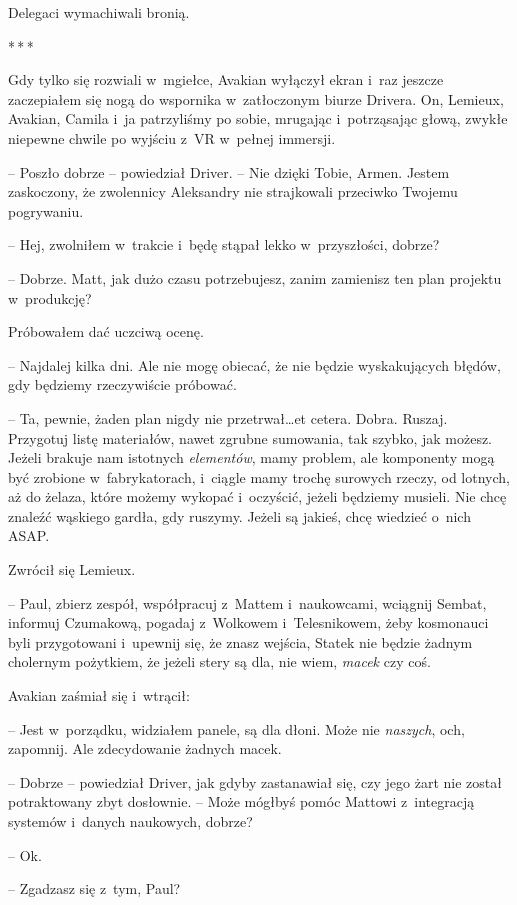 \documentclass[oneside,polish,12pt,sfheadings]{mwbk}
\newcommand{\threeast}{\bigskip\par\centerline{*\,*\,*}\medskip\par}%
\begin{document}
Delegaci wymachiwali bronią.

\threeast

Gdy tylko się rozwiali w~mgiełce, Avakian wyłączył ekran i~raz jeszcze
zaczepiałem się nogą do wspornika w~zatłoczonym biurze Drivera. On,
Lemieux, Avakian, Camila i~ja patrzyliśmy po sobie, mrugając i~potrząsając głową, zwykłe niepewne chwile po wyjściu z~VR w~pełnej
immersji.

-- Poszło dobrze -- powiedział Driver. -- Nie dzięki Tobie, Armen. Jestem
zaskoczony, że zwolennicy Aleksandry nie strajkowali przeciwko Twojemu
pogrywaniu.

-- Hej, zwolniłem w~trakcie i~będę stąpał lekko w~przyszłości, dobrze?

-- Dobrze. Matt, jak dużo czasu potrzebujesz, zanim zamienisz ten plan
projektu w~produkcję?

Próbowałem dać uczciwą ocenę. 

-- Najdalej kilka dni. Ale nie mogę
obiecać, że nie będzie wyskakujących błędów, gdy będziemy rzeczywiście
próbować.

-- Ta, pewnie, żaden plan nigdy nie przetrwał\ldots et cetera. Dobra.
Ruszaj. Przygotuj listę materiałów, nawet zgrubne sumowania, tak szybko,
jak możesz. Jeżeli brakuje nam istotnych \emph{elementów}, mamy problem,
ale komponenty mogą być zrobione w~fabrykatorach, i~ciągle mamy trochę
surowych rzeczy, od lotnych, aż do żelaza, które możemy wykopać i~oczyścić, jeżeli będziemy musieli. Nie chcę znaleźć wąskiego gardła, gdy
ruszymy. Jeżeli są jakieś, chcę wiedzieć o~nich ASAP.

Zwrócił się Lemieux. 

-- Paul, zbierz zespół, współpracuj z~Mattem i~naukowcami, wciągnij Sembat, informuj Czumakową, pogadaj z~Wolkowem i~Telesnikowem, żeby kosmonauci byli przygotowani i~upewnij się, że znasz
wejścia, Statek nie będzie żadnym cholernym pożytkiem, że jeżeli stery
są dla, nie wiem, \emph{macek} czy coś.

Avakian zaśmiał się i~wtrącił: 

-- Jest w~porządku, widziałem panele, są
dla dłoni. Może nie \emph{naszych}, och, zapomnij. Ale zdecydowanie
żadnych macek.

-- Dobrze -- powiedział Driver, jak gdyby zastanawiał się, czy jego żart
nie został potraktowany zbyt dosłownie. -- Może mógłbyś pomóc Mattowi z~integracją systemów i~danych naukowych, dobrze?

-- Ok.

-- Zgadzasz się z~tym, Paul?
\end{document}
